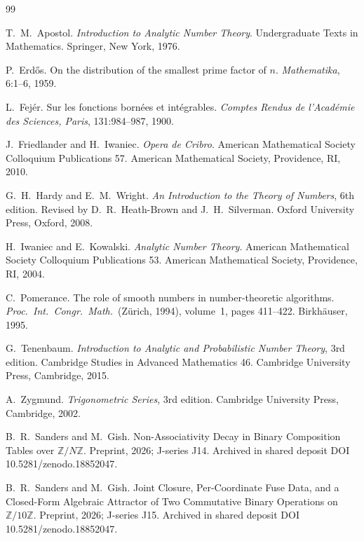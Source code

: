 \documentclass[11pt,reqno]{amsart}
\theoremstyle{plain}
\theoremstyle{definition}
\theoremstyle{remark}
\begin{document}
\begin{thebibliography}{99}

T.~M.~Apostol.
\newblock \emph{Introduction to Analytic Number Theory}.
\newblock Undergraduate Texts in Mathematics. Springer, New York, 1976.

P.~Erd\H{o}s.
\newblock On the distribution of the smallest prime factor of $n$.
\newblock \emph{Mathematika}, 6:1--6, 1959.

L.~Fej\'{e}r.
\newblock Sur les fonctions born\'{e}es et int\'{e}grables.
\newblock \emph{Comptes Rendus de l'Acad\'{e}mie des Sciences, Paris},
131:984--987, 1900.

J.~Friedlander and H.~Iwaniec.
\newblock \emph{Opera de Cribro}.
\newblock American Mathematical Society Colloquium Publications 57.
\newblock American Mathematical Society, Providence, RI, 2010.

G.~H.~Hardy and E.~M.~Wright.
\newblock \emph{An Introduction to the Theory of Numbers}, 6th edition.
\newblock Revised by D.~R.~Heath-Brown and J.~H.~Silverman.
\newblock Oxford University Press, Oxford, 2008.

H.~Iwaniec and E.~Kowalski.
\newblock \emph{Analytic Number Theory}.
\newblock American Mathematical Society Colloquium Publications 53.
\newblock American Mathematical Society, Providence, RI, 2004.

C.~Pomerance.
\newblock The role of smooth numbers in number-theoretic algorithms.
\newblock \emph{Proc.\ Int.\ Congr.\ Math.}\ (Z\"{u}rich, 1994),
volume~1, pages 411--422. Birkh\"{a}user, 1995.

G.~Tenenbaum.
\newblock \emph{Introduction to Analytic and Probabilistic Number Theory},
3rd edition.
\newblock Cambridge Studies in Advanced Mathematics 46. Cambridge
University Press, Cambridge, 2015.

A.~Zygmund.
\newblock \emph{Trigonometric Series}, 3rd edition.
\newblock Cambridge University Press, Cambridge, 2002.

B.~R.~Sanders and M.~Gish.
\newblock Non-Associativity Decay in Binary Composition Tables over
$\mathbb{Z}/N\mathbb{Z}$.
\newblock Preprint, 2026; J-series J14.
\newblock Archived in shared deposit DOI 10.5281/zenodo.18852047.

B.~R.~Sanders and M.~Gish.
\newblock Joint Closure, Per-Coordinate Fuse Data, and a Closed-Form
Algebraic Attractor of Two Commutative Binary Operations on
$\mathbb{Z}/10\mathbb{Z}$.
\newblock Preprint, 2026; J-series J15.
\newblock Archived in shared deposit DOI 10.5281/zenodo.18852047.

\end{thebibliography}
\end{document}
